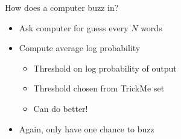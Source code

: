 \documentclass[compress]{beamer}
\begin{document}






\begin{frame}{How does a computer buzz in?}

  \begin{itemize}
  \item Ask computer for guess every $N$ words
  \item Compute average log probability
  \begin{itemize}
  \item Threshold on log probability of output
  \item Threshold chosen from TrickMe set
  \item Can do better!
  \end{itemize}
  \item Again, only have one chance to buzz
  \end{itemize}
\end{frame}
\end{document}
